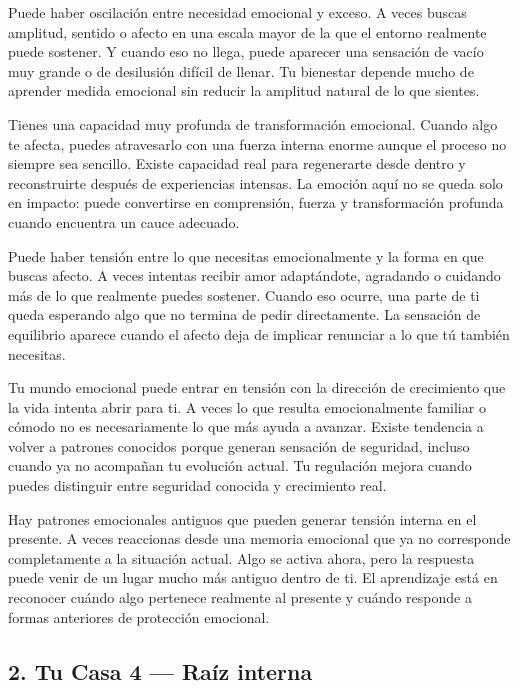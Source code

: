 \documentclass[11pt,a4paper]{article}
\begin{document}
Puede haber oscilación entre necesidad emocional y exceso. A veces buscas amplitud, sentido o afecto en una escala mayor de la que el entorno realmente puede sostener. Y cuando eso no llega, puede aparecer una sensación de vacío muy grande o de desilusión difícil de llenar. Tu bienestar depende mucho de aprender medida emocional sin reducir la amplitud natural de lo que sientes.

Tienes una capacidad muy profunda de transformación emocional. Cuando algo te afecta, puedes atravesarlo con una fuerza interna enorme aunque el proceso no siempre sea sencillo. Existe capacidad real para regenerarte desde dentro y reconstruirte después de experiencias intensas. La emoción aquí no se queda solo en impacto: puede convertirse en comprensión, fuerza y transformación profunda cuando encuentra un cauce adecuado.

Puede haber tensión entre lo que necesitas emocionalmente y la forma en que buscas afecto. A veces intentas recibir amor adaptándote, agradando o cuidando más de lo que realmente puedes sostener. Cuando eso ocurre, una parte de ti queda esperando algo que no termina de pedir directamente. La sensación de equilibrio aparece cuando el afecto deja de implicar renunciar a lo que tú también necesitas.

Tu mundo emocional puede entrar en tensión con la dirección de crecimiento que la vida intenta abrir para ti. A veces lo que resulta emocionalmente familiar o cómodo no es necesariamente lo que más ayuda a avanzar. Existe tendencia a volver a patrones conocidos porque generan sensación de seguridad, incluso cuando ya no acompañan tu evolución actual. Tu regulación mejora cuando puedes distinguir entre seguridad conocida y crecimiento real.

Hay patrones emocionales antiguos que pueden generar tensión interna en el presente. A veces reaccionas desde una memoria emocional que ya no corresponde completamente a la situación actual. Algo se activa ahora, pero la respuesta puede venir de un lugar mucho más antiguo dentro de ti. El aprendizaje está en reconocer cuándo algo pertenece realmente al presente y cuándo responde a formas anteriores de protección emocional.

\vspace{0.8cm}

\subsection{2. Tu Casa 4 — Raíz interna}
\end{document}
